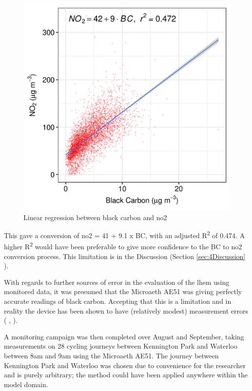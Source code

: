 \begin{figure}[H]
\centering
\includegraphics[scale=1]{images/black_carbon_no2_conversion.png}
\caption{Linear regression between black carbon and \gls{no2}}
\label{fig:black_carbon_no2_conversion}
\end{figure}

This gave a conversion of \gls{no2} = 41 + 9.1 x BC, with an adjusted R\textsuperscript{2} of 0.474. A higher R\textsuperscript{2} would have been preferable to give more confidence to the BC to \gls{no2} conversion process. This limitation is in the Discussion (Section \ref{sec:4Discussion} ).

With regards to further sources of error in the evaluation of the \gls{lhem} using monitored data, it was presumed that the Microaeth AE51 was giving perfectly accurate readings of black carbon. Accepting that this is a limitation and in reality the device has been shown to have (relatively modest) measurement errors ( \cite{Cheng2013}, \cite{Viana2015} ).

A monitoring campaign was then completed over August and September, taking measurements on 28 cycling journeys between Kennington Park and Waterloo between 8am and 9am using the Microaeth AE51. The journey between Kennington Park and Waterloo was chosen due to convenience for the researcher and is purely arbitrary; the method could have been applied anywhere within the model domain.

